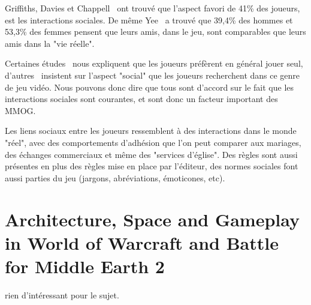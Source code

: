 \documentclass[11pt,a4paper]{article}
\begin{document}
Griffiths, Davies et Chappell~\cite{BreakingSteretype} ont trouvé que l'aspect favori de 41\% des joueurs, est les interactions sociales. De même Yee~\cite{1159988} a trouvé que 39,4\% des hommes et 53,3\% des femmes pensent que leurs amis, dans le jeu, sont comparables que leurs amis dans la "vie réelle". 
\par Certaines études~\cite{1124834,1031667} nous expliquent que les joueurs préfèrent en général jouer seul, d'autres~\cite{1159988,Jakobsson03thesopranos} insistent sur l'aspect "social" que les joueurs recherchent dans ce genre de jeu vidéo. Nous pouvons donc dire que tous sont d'accord sur le fait que les interactions sociales sont courantes, et sont donc un facteur important des MMOG. 
\par Les liens sociaux entre les joueurs ressemblent à des interactions dans le monde "réel", avec des comportements d'adhésion que l'on peut comparer aux mariages, des échanges commerciaux et même des "services d'église". Des règles sont aussi présentes en plus des règles mise en place par l'éditeur, des normes sociales font aussi parties du jeu (jargons, abréviations, émoticones, etc). 

\section{Architecture, Space and Gameplay in World of Warcraft and Battle for Middle Earth 2}
rien d'intéressant pour le sujet.
\end{document}
